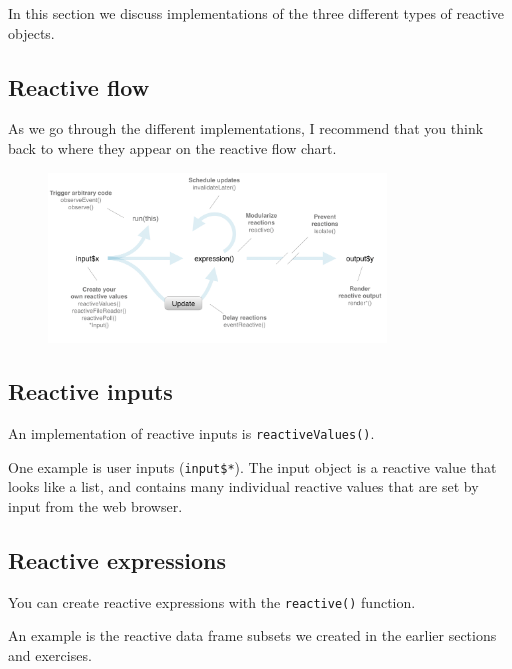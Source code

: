 \documentclass[
  letterpaper,
  DIV=11,
  numbers=noendperiod]{scrreprt}
\begin{document}
In this section we discuss implementations of the three different types
of reactive objects.

\hypertarget{reactive-flow-3}{%
\subsection{Reactive flow}\label{reactive-flow-3}}

As we go through the different implementations, I recommend that you
think back to where they appear on the reactive flow chart.

\begin{figure}

{\centering \includegraphics[width=0.8\textwidth,height=\textheight]{./images/reactive-flow.png}

}

\end{figure}

\hypertarget{reactive-inputs}{%
\subsection{Reactive inputs}\label{reactive-inputs}}

An implementation of reactive inputs is \texttt{reactiveValues()}.

One example is user inputs (\texttt{input\$*}). The input object is a
reactive value that looks like a list, and contains many individual
reactive values that are set by input from the web browser.

\hypertarget{reactive-expressions-1}{%
\subsection{Reactive expressions}\label{reactive-expressions-1}}

You can create reactive expressions with the \texttt{reactive()}
function.

An example is the reactive data frame subsets we created in the earlier
sections and exercises.
\end{document}
